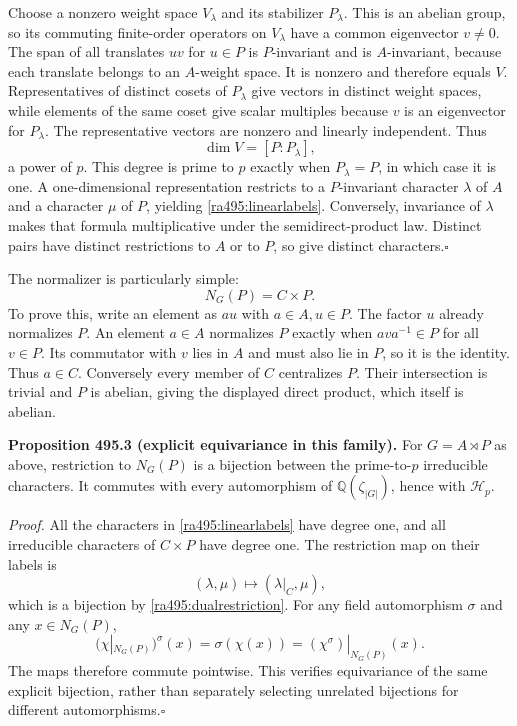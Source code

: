 \documentclass[11pt]{article}
\begin{document}
Choose a nonzero weight space $V_\lambda$ and its stabilizer
$P_\lambda$. This is an abelian group, so its commuting finite-order
operators on $V_\lambda$ have a common eigenvector $v\ne0$.
The span of all translates $u v$ for $u\in P$ is $P$-invariant and is
$A$-invariant, because each translate belongs to an $A$-weight space.
It is nonzero and therefore equals $V$. Representatives of distinct
cosets of $P_\lambda$ give vectors in distinct weight spaces, while
elements of the same coset give scalar multiples because $v$ is an
eigenvector for $P_\lambda$. The representative vectors are nonzero
and linearly independent. Thus
\[
 \dim V=[P:P_\lambda],
\]
a power of $p$. This degree is prime to $p$ exactly when
$P_\lambda=P$, in which case it is one. A one-dimensional
representation restricts to a $P$-invariant character $\lambda$ of
$A$ and a character $\mu$ of $P$, yielding
\eqref{ra495:linearlabels}. Conversely, invariance of $\lambda$ makes
that formula multiplicative under the semidirect-product law. Distinct
pairs have distinct restrictions to $A$ or to $P$, so give distinct
characters.\hfill$\square$

The normalizer is particularly simple:
\begin{equation}\label{ra495:normalizer}
 N_G(P)=C\times P.
\end{equation}
To prove this, write an element as $a u$ with $a\in A,u\in P$.
The factor $u$ already normalizes $P$. An element $a\in A$ normalizes
$P$ exactly when $a v a^{-1}\in P$ for all $v\in P$. Its commutator
with $v$ lies in $A$ and must also lie in $P$, so it is the identity.
Thus $a\in C$. Conversely every member of $C$ centralizes $P$.
Their intersection is trivial and $P$ is abelian, giving the displayed
direct product, which itself is abelian.

\textbf{Proposition 495.3 (explicit equivariance in this family).}
For $G=A\rtimes P$ as above, restriction to $N_G(P)$ is a bijection
between the prime-to-$p$ irreducible characters. It commutes with every
automorphism of $\mathbb Q(\zeta_{|G|})$, hence with $\mathcal H_p$.

\emph{Proof.}
All the characters in \eqref{ra495:linearlabels} have degree one, and
all irreducible characters of $C\times P$ have degree one. The restriction
map on their labels is
\[
 (\lambda,\mu)\longmapsto(\lambda|_C,\mu),
\]
which is a bijection by \eqref{ra495:dualrestriction}. For any field
automorphism $\sigma$ and any $x\in N_G(P)$,
\[
 (\chi|_{N_G(P)})^\sigma(x)=\sigma(\chi(x))
                 =(\chi^\sigma)|_{N_G(P)}(x).
\]
The maps therefore commute pointwise. This verifies equivariance of the
same explicit bijection, rather than separately selecting unrelated
bijections for different automorphisms.\hfill$\square$
\end{document}

